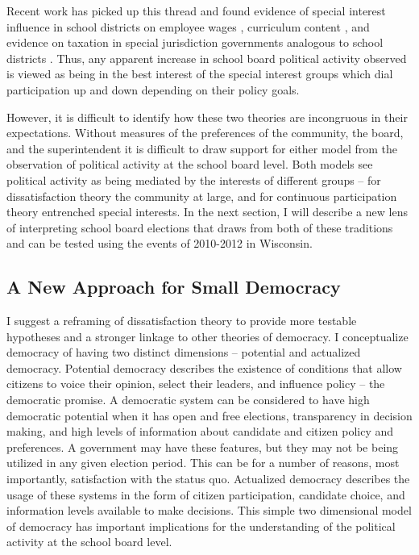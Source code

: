Recent work has picked up this thread and found evidence of special interest 
influence in school districts on employee wages 
\citep{RefWorks:207,RefWorks:218,anzia11}, curriculum content 
\citep{RefWorks:240,RefWorks:347}, and evidence on taxation in special jurisdiction 
governments analogous to school districts \citep{berry2}. Thus, any apparent 
increase in school board political activity observed is viewed as being in the 
best interest of the special interest groups which dial participation up and down 
depending on their policy goals. 

However, it is difficult to identify how these two theories are incongruous in 
their expectations. Without measures of the preferences of the community, the 
board, and the superintendent it is difficult to draw support for either model 
from the observation of political activity at the school board level. Both models 
see political activity as being mediated by the interests of different groups -- 
for dissatisfaction theory the community at large, and for continuous participation 
theory entrenched special interests. In the next section, I will describe a new 
lens of interpreting school board elections that draws from both of these 
traditions and can be tested using the events of 2010-2012 in Wisconsin. 

\subsection{A New Approach for Small Democracy}

I suggest a reframing of dissatisfaction theory to provide more testable hypotheses 
and a stronger linkage to other theories of democracy. I conceptualize 
democracy of having two distinct dimensions -- potential and actualized democracy. 
Potential democracy describes the existence of conditions that allow citizens to 
voice their opinion, select their leaders, and influence policy -- the democratic promise. 
A democratic 
system can be considered to have high democratic potential when it has open and 
free elections, transparency in decision making, and high levels of information 
about candidate and citizen policy and preferences. A government may 
have these features, but they may not be being utilized in any given election 
period. This can be for a number of reasons, most importantly, satisfaction with 
the status quo. Actualized democracy describes the usage of these systems in the 
form of citizen participation, candidate choice, and information levels 
available to make decisions. This simple two dimensional model of democracy 
has important implications for the understanding of the political activity at the
school board level. 

